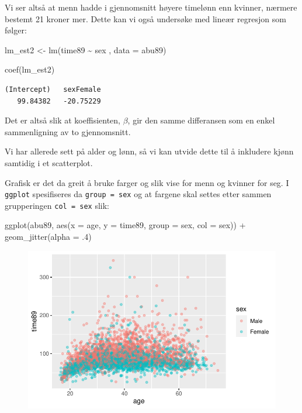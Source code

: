 \documentclass[
  letterpaper,
  DIV=11,
  numbers=noendperiod]{scrreprt}
\newenvironment{Shaded}{\begin{snugshade}}{\end{snugshade}}
\newcommand{\AttributeTok}[1]{\textcolor[rgb]{0.40,0.45,0.13}{#1}}
\newcommand{\DecValTok}[1]{\textcolor[rgb]{0.68,0.00,0.00}{#1}}
\newcommand{\FunctionTok}[1]{\textcolor[rgb]{0.28,0.35,0.67}{#1}}
\newcommand{\NormalTok}[1]{\textcolor[rgb]{0.00,0.23,0.31}{#1}}
\newcommand{\OtherTok}[1]{\textcolor[rgb]{0.00,0.23,0.31}{#1}}
\newcommand{\SpecialCharTok}[1]{\textcolor[rgb]{0.37,0.37,0.37}{#1}}
\theoremstyle{definition}
\theoremstyle{remark}
\begin{document}
Vi ser altså at menn hadde i gjennomsnitt høyere timelønn enn kvinner,
nærmere bestemt 21 kroner mer. Dette kan vi også undersøke med lineær
regresjon som følger:

\begin{Shaded}
\begin{Highlighting}[]
\NormalTok{lm\_est2 }\OtherTok{\textless{}{-}} \FunctionTok{lm}\NormalTok{(time89 }\SpecialCharTok{\textasciitilde{}}\NormalTok{ sex , }\AttributeTok{data =}\NormalTok{ abu89)}

\FunctionTok{coef}\NormalTok{(lm\_est2)}
\end{Highlighting}
\end{Shaded}

\begin{verbatim}
(Intercept)   sexFemale 
   99.84382   -20.75229 
\end{verbatim}

Det er altså slik at koeffisienten, \(\beta\), gir den samme differansen
som en enkel sammenligning av to gjennomsnitt.

Vi har allerede sett på alder og lønn, så vi kan utvide dette til å
inkludere kjønn samtidig i et scatterplot.

Grafisk er det da greit å bruke farger og slik vise for menn og kvinner
for seg. I \texttt{ggplot} spesifiseres da \texttt{group\ =\ sex} og at
fargene skal settes etter sammen grupperingen \texttt{col\ =\ sex} slik:

\begin{Shaded}
\begin{Highlighting}[]
\FunctionTok{ggplot}\NormalTok{(abu89, }\FunctionTok{aes}\NormalTok{(}\AttributeTok{x =}\NormalTok{ age, }\AttributeTok{y =}\NormalTok{ time89, }\AttributeTok{group =}\NormalTok{ sex, }\AttributeTok{col =}\NormalTok{ sex)) }\SpecialCharTok{+}
  \FunctionTok{geom\_jitter}\NormalTok{(}\AttributeTok{alpha =}\NormalTok{ .}\DecValTok{4}\NormalTok{)}
\end{Highlighting}
\end{Shaded}

\begin{figure}[H]

{\centering \includegraphics{./linearRegresjon_files/figure-pdf/unnamed-chunk-18-1.pdf}

}

\end{figure}
\end{document}
